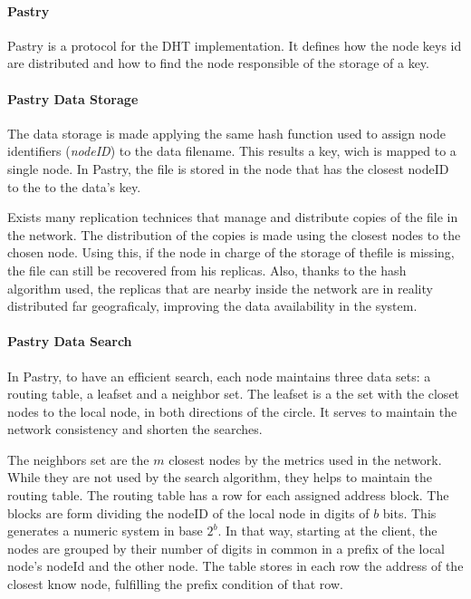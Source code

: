 \paragraph{Pastry}
\label{sec:pastry}
Pastry is a protocol for the DHT implementation. It defines how the node keys id
are distributed and how to find the node responsible of the storage of a key.

\paragraph{Pastry Data Storage}

The data storage is made applying the same hash function used to assign node
identifiers (\textit{nodeID}) to the data filename. This results a key, wich is
mapped to a single node. In Pastry, the file is stored in the node that has the closest nodeID to
the to the data's key.

Exists many replication technices that manage and distribute copies of the file
in the network. The distribution of the copies is made using the closest nodes
to the chosen node. Using this, if the node in charge of the storage of thefile
is missing, the file can still be recovered from his replicas. Also, thanks
to the hash algorithm used, the replicas that are nearby inside the network are
in reality distributed far geograficaly, improving the data availability
in the system.

\paragraph{Pastry Data Search}

In Pastry, to have an efficient search, each node maintains three data sets:
a routing table, a leafset and a neighbor set.
The leafset is a the set with the closet nodes to the local node, in both
directions of the circle. It serves to maintain the network consistency and
shorten the searches.

The neighbors set are the $m$ closest nodes by the metrics used in the network.
While they are not used by the search algorithm, they helps to maintain the
routing table.
The routing table has a row for each assigned address block. The blocks are
form dividing the nodeID of the local node in digits of $b$ bits. This
generates a numeric system in base $2^b$. In that way, starting at the client,
the nodes are grouped by their number of digits in common in a prefix of the
local node's nodeId and the other node. The table stores in each row the
address of the closest know node, fulfilling the prefix condition of that row.

